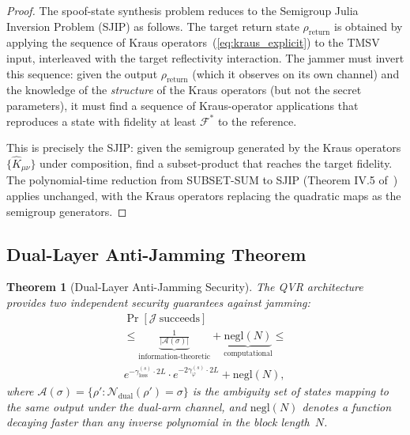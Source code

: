 \documentclass[journal]{IEEEtran}
\newtheorem{theorem}{Theorem}
\begin{document}
\begin{proof}
The spoof-state synthesis problem reduces to the Semigroup Julia Inversion Problem (SJIP) as follows. The target return state $\rho_{\text{return}}$ is obtained by applying the sequence of Kraus operators~(\ref{eq:kraus_explicit}) to the TMSV input, interleaved with the target reflectivity interaction. The jammer must invert this sequence: given the output $\rho_{\text{return}}$ (which it observes on its own channel) and the knowledge of the \textit{structure} of the Kraus operators (but not the secret parameters), it must find a sequence of Kraus-operator applications that reproduces a state with fidelity at least $\mathcal{F}^{*}$ to the reference.

This is precisely the SJIP: given the semigroup generated by the Kraus operators $\{\hat{K}_{\mu\nu}\}$ under composition, find a subset-product that reaches the target fidelity. The polynomial-time reduction from SUBSET-SUM to SJIP (Theorem IV.5 of~\cite{gautum2024rigorous}) applies unchanged, with the Kraus operators replacing the quadratic maps as the semigroup generators.
\end{proof}

\subsection{Dual-Layer Anti-Jamming Theorem}

\begin{theorem}[Dual-Layer Anti-Jamming Security]\label{thm:dual_anti_jamming}
The QVR architecture provides two independent security guarantees against jamming:
\begin{equation}\label{eq:dual_security}
\begin{gathered}
\Pr[\mathcal{J}\ \text{succeeds}]\\ \leq \underbrace{\frac{1}{|\mathcal{A}(\sigma)|}}_{\text{information-theoretic}} + \underbrace{\text{negl}(N)}_{\text{computational}} \leq \\e^{-\gamma_{\text{loss}}^{(s)} \cdot 2L} \cdot e^{-2\gamma_\varphi^{(s)} \cdot 2L} + \text{negl}(N),
\end{gathered}
\end{equation}
where $\mathcal{A}(\sigma) = \{\rho' : \mathcal{N}_{\text{dual}}(\rho') = \sigma\}$ is the ambiguity set of states mapping to the same output under the dual-arm channel, and $\text{negl}(N)$ denotes a function decaying faster than any inverse polynomial in the block length~$N$.
\end{theorem}
\end{document}
